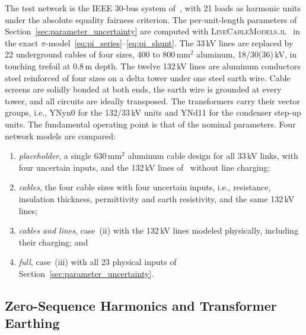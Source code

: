 The test network is the IEEE 30-bus system of~\cite{vanacker_shhc}, with 21 loads as harmonic units under the absolute equality fairness criterion. The per-unit-length parameters of Section~\ref{sec:parameter_uncertainty} are computed with \textsc{LineCableModels.jl}~\cite{lcm_2026} in the exact $\pi$-model~\eqref{eq:pi_series}--\eqref{eq:pi_shunt}. The 33\,kV lines are replaced by 22 underground cables of four sizes, 400 to 800\,mm$^{2}$ aluminum, 18/30(36)\,kV, in touching trefoil at 0.8\,m depth. The twelve 132\,kV lines are aluminum conductors steel reinforced of four sizes on a delta tower under one steel earth wire. Cable screens are solidly bonded at both ends, the earth wire is grounded at every tower, and all circuits are ideally transposed. The transformers carry their vector groups, i.e., YNyn0 for the 132/33\,kV units and YNd11 for the condenser step-up units. The fundamental operating point is that of the nominal parameters. Four network models are compared:
\begin{enumerate}
    \item[(i)] \textit{placeholder}, a single 630\,mm$^{2}$ aluminum cable design for all 33\,kV links, with four uncertain inputs, and the 132\,kV lines of~\cite{vanacker_shhc} without line charging;
    \item[(ii)] \textit{cables}, the four cable sizes with four uncertain inputs, i.e., resistance, insulation thickness, permittivity and earth resistivity, and the same 132\,kV lines;
    \item[(iii)] \textit{cables and lines}, case~(ii) with the 132\,kV lines modeled physically, including their charging; and
    \item[(iv)] \textit{full}, case~(iii) with all 23 physical inputs of Section~\ref{sec:parameter_uncertainty}.
\end{enumerate}

\subsection{Zero-Sequence Harmonics and Transformer Earthing}
\label{sec:zero_sequence_results}

